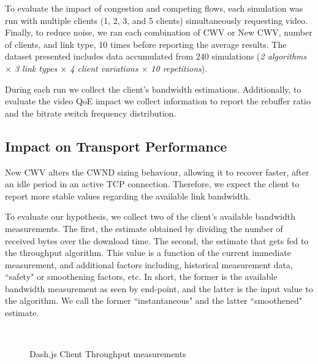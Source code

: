 \documentclass[10pt,sigconf,anonymous]{acmart}
\begin{document}
To evaluate the impact of congestion and competing flows, each simulation was run with multiple clients (1, 2, 3, and 5 clients) simultaneously requesting video. Finally, to reduce noise, we ran each combination of CWV or New CWV, number of clients, and link type, 10 times before reporting the average results. The dataset presented includes data accumulated from 240 simulations (\emph{2 algorithms $\times$ 3 link types $\times$ 4 client variations $\times$ 10 repetitions}). 

During each run we collect the client's bandwidth estimations. Additionally, to evaluate the video QoE impact we collect information to report the rebuffer ratio and the bitrate switch frequency distribution.

\subsection{Impact on Transport Performance} 
\label{sec:transport-impact}

New CWV alters the CWND sizing behaviour, allowing it to recover faster, after an idle period in an active TCP connection. Therefore, we expect the client to report more stable values regarding the available link bandwidth. 

To evaluate our hypothesis, we collect two of the client's available bandwidth measurements. The first, the estimate obtained by dividing the number of received bytes over the download time. The second, the estimate that gets fed to the throughput algorithm. This value is a function of the current immediate measurement, and additional factors including, historical measurement data, ``safety" or smoothening factors, etc. In short, the former is the available bandwidth measurement as seen by end-point, and the latter is the input value to the algorithm. We call the former ``instantaneous" and the latter ``smoothened" estimate.

\begin{figure}[t!]
  \centering
  \\
  \caption{Dash.js Client Throughput measurements}
  \label{fig:throughput-clients}
\end{figure}
\end{document}
